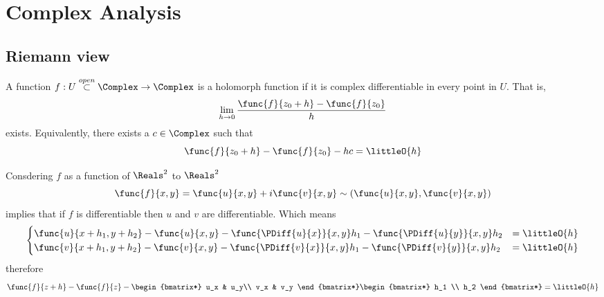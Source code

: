 \chapter{Complex Analysis}
\section{Riemann view}
\begin{definition}[Holomorph] \label{eq:complexHolomorphism}
    A function \(f: U \overset{open}{\subset} \Complex \to \Complex\) is a holomorph function if it is complex differentiable in every point in \(U\). That is, 
    \begin{equation*}
        \lim_{h \to 0} \dfrac{\func{f}{z_0 + h} - \func{f}{z_0}}{h}
    \end{equation*}
    exists. Equivalently, there exists a \(c \in \Complex\) such that 
    \begin{equation} 
        \func{f}{z_0 + h} - \func{f}{z_0} - hc = \littleO{h} 
    \end{equation}
\end{definition}
Consdering \(f\) as a function of \(\Reals^2\) to \(\Reals^2\) 
\begin{equation*}
    \func{f}{x,y} =  \func{u}{x,y}+ i\func{v}{x,y} \sim \left(\func{u}{x,y}, \func{v}{x,y}\right)
\end{equation*}
implies that if \(f\) is differentiable then \(u\) and \(v\) are differentiable. Which means
\begin{equation*}
    \begin{cases}
        \func{u}{x + h_1 , y + h_2} - \func{u}{x,y} - \func{\PDiff{u}{x}}{x,y}h_1 - \func{\PDiff{u}{y}}{x,y}h_2 &= \littleO{h}\\
        \func{v}{x + h_1 , y + h_2} - \func{v}{x,y} - \func{\PDiff{v}{x}}{x,y}h_1 - \func{\PDiff{v}{y}}{x,y}h_2 &= \littleO{h}\\
    \end{cases}
\end{equation*}
therefore 
\begin{equation*}
    \func{f}{z + h} - \func{f}{z} - \begin{bmatrix*} 
        u_x & u_y\\
        v_x & v_y
    \end{bmatrix*} \begin{bmatrix*}
         h_1 \\
          h_2 
    \end{bmatrix*}= \littleO{h}\\
\end{equation*}
